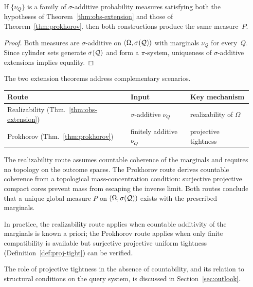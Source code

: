 \begin{proposition}
\label{prop:route-consistency}
If $\{\nu_Q\}$ is a family of $\sigma$-additive probability measures
satisfying both the hypotheses of Theorem~\ref{thm:obs-extension}
and those of Theorem~\ref{thm:prokhorov}, then both constructions
produce the same measure~$P$.
\end{proposition}
\begin{proof}
Both measures are $\sigma$-additive on $(\Omega,\sigma(\mathcal{Q}))$
with marginals $\nu_Q$ for every~$Q$.
Since cylinder sets generate $\sigma(\mathcal{Q})$ and form a
$\pi$-system, uniqueness of $\sigma$-additive extensions implies
equality.
\end{proof}

\begin{remark}
The two extension theorems address complementary scenarios.

\smallskip
\begin{center}
\begin{tabular}{lll}
\hline
Route & Input & Key mechanism \\
\hline
Realizability (Thm.~\ref{thm:obs-extension}) &
  $\sigma$-additive $\nu_Q$ & realizability of $\Omega$ \\
Prokhorov (Thm.~\ref{thm:prokhorov}) &
  finitely additive $\nu_Q$ & projective tightness \\
\hline
\end{tabular}
\end{center}

\smallskip\noindent
The realizability route assumes countable coherence of the marginals and
requires no topology on the outcome spaces.  The Prokhorov route derives
countable coherence from a topological mass-concentration condition:
surjective projective compact cores prevent mass from escaping the
inverse limit.  Both routes conclude that a unique global measure $P$
on $(\Omega,\sigma(\mathcal{Q}))$ exists with the prescribed marginals.

In practice, the realizability route applies when countable additivity
of the marginals is known a priori; the Prokhorov route applies when
only finite compatibility is available but surjective projective
uniform tightness (Definition~\ref{def:proj-tight}) can be verified.

The role of projective tightness in the absence of countability, and
its relation to structural conditions on the query system, is discussed
in Section~\ref{sec:outlook}.
\end{remark}

